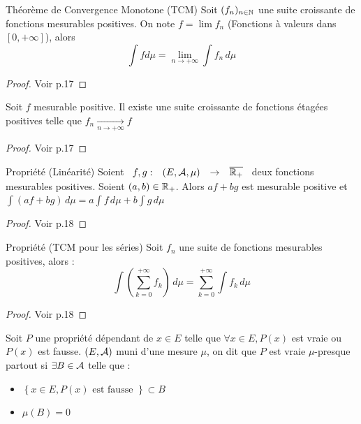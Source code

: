 \documentclass[]{report}
\begin{document}
\begin{tm}{Théorème de Convergence Monotone (TCM)}{}
        Soit $(f_n)_{n\in\mathbb{N}}$ une suite croissante de fonctions mesurables positives. On note $f=\lim f_n$ (Fonctions à valeurs dans $[0,+\infty]$), alors
        \[\int f d\mu=\lim_{n\to+\infty}\int f_n\,d\mu\]
\end{tm}

\begin{proof}{}{}
    Voir p.17
\end{proof}

\begin{prop}{}{}
    Soit $f$ mesurable positive. Il existe une suite croissante de fonctions étagées positives telle que $\displaystyle{f_n\underset{n\to+\infty}{\longrightarrow}f}$
\end{prop}

\begin{proof}{}{}
    Voir p.17
\end{proof}

\begin{prop}{Propriété (Linéarité)}{}
    Soient $\begin{array}{ccccc} f,g : & (E,\mathcal{A},\mu) & \to & \overline{\mathbb{R}_+} \end{array}$ deux fonctions mesurables positives. Soient $(a,b)\in\mathbb{R}_+$.
    Alors $af+bg$ est mesurable positive et $\int(af+bg)\,d\mu=a\int f\,d\mu+b\int g\,d\mu$
\end{prop}

\begin{proof}{}{}
    Voir p.18
\end{proof}

\begin{prop}{Propriété (TCM pour les séries)}{}
    Soit $f_n$ une suite de fonctions mesurables positives, alors :
    \[\int(\sum_{k=0}^{+\infty}f_k)\,d\mu=\sum_{k=0}^{+\infty}\int f_k\,d\mu\]
\end{prop}

\begin{proof}{}{}
    Voir p.18
\end{proof}

\begin{df}{}{}
    Soit $P$ une propriété dépendant de $x\in E$ telle que $\forall x\in E,P(x) $ est vraie ou $P(x)$ est fausse. $(E,\mathcal{A})$ muni d'une mesure $\mu$, on dit que $P$ est vraie $\mu$-presque partout si $\exists B \in \mathcal{A}$ telle que :
    \begin{itemize}
        \item $\left\{x\in E,P(x)\text{ est fausse }\right\}\subset B$
        \item $\mu(B)=0$
    \end{itemize}
\end{df}
\end{document}
